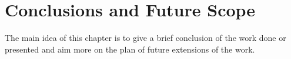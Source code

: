 \chapter{Conclusions and Future Scope}
The main idea of this chapter is to give a brief conclusion of the work done or 
presented and aim more on the plan of future extensions of the work. 
